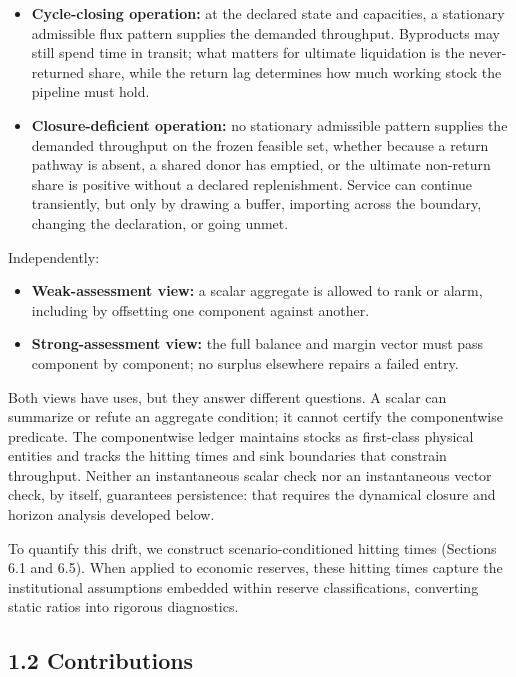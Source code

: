 \documentclass[11pt]{article}
\begin{document}
\begin{itemize}\setlength{\itemsep}{2pt}
\item \textbf{Cycle-closing operation:} at the declared state and capacities, a stationary admissible flux pattern supplies the demanded throughput. Byproducts may still spend time in transit; what matters for ultimate liquidation is the never-returned share, while the return lag determines how much working stock the pipeline must hold.
\item \textbf{Closure-deficient operation:} no stationary admissible pattern supplies the demanded throughput on the frozen feasible set, whether because a return pathway is absent, a shared donor has emptied, or the ultimate non-return share is positive without a declared replenishment. Service can continue transiently, but only by drawing a buffer, importing across the boundary, changing the declaration, or going unmet.
\end{itemize}

Independently:

\begin{itemize}\setlength{\itemsep}{2pt}
\item \textbf{Weak-assessment view:} a scalar aggregate is allowed to rank or alarm, including by offsetting one component against another.
\item \textbf{Strong-assessment view:} the full balance and margin vector must pass component by component; no surplus elsewhere repairs a failed entry.
\end{itemize}

Both views have uses, but they answer different questions. A scalar can summarize or refute an aggregate condition; it cannot certify the componentwise predicate. The componentwise ledger maintains stocks as first-class physical entities and tracks the hitting times and sink boundaries that constrain throughput. Neither an instantaneous scalar check nor an instantaneous vector check, by itself, guarantees persistence: that requires the dynamical closure and horizon analysis developed below.

To quantify this drift, we construct scenario-conditioned hitting times (Sections 6.1 and 6.5). When applied to economic reserves, these hitting times capture the institutional assumptions embedded within reserve classifications, converting static ratios into rigorous diagnostics.

\subsection*{1.2 Contributions}\label{12-contributions}
\end{document}
